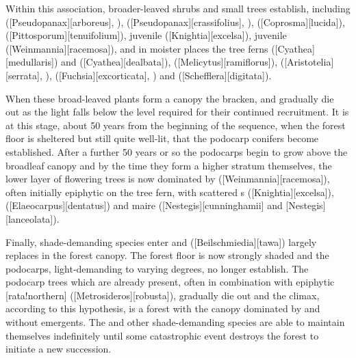 Within this association, broader-leaved shrubs and small trees establish, including  ([Pseudopanax][arboreus], ),  ([Pseudopanax][crassifolius], ),  ([Coprosma][lucida]),  ([Pittosporum][tenuifolium]), juvenile  ([Knightia][excelsa]), juvenile  ([Weinmannia][racemosa]), and in moister places the tree ferns  ([Cyathea][medullaris]) and  ([Cyathea][dealbata]),  ([Melicytus][ramiflorus]),  ([Aristotelia][serrata], ),  ([Fuchsia][excorticata], ) and  ([Schefflera][digitata]).

When these broad-leaved plants form a canopy the bracken,  and  gradually die out as the light falls below the level required for their continued recruitment.
It is at this stage, about 50 years from the beginning of the sequence, when the forest floor is sheltered but still quite well-lit, that the podocarp conifers become established.
After a further 50 years or so the podocarps begin to grow above the broadleaf canopy and by the time they form a higher stratum themselves, the lower layer of flowering trees is now dominated by  ([Weinmannia][racemosa]), often initially epiphytic on the  tree fern, with scattered s ([Knightia][excelsa]),  ([Elaeocarpus][dentatus]) and maire ([Nestegis][cunninghamii] and [Nestegis][lanceolata]).

Finally, shade-demanding species enter and  ([Beilschmiedia][tawa]) largely replaces  in the forest canopy.
The forest floor is now strongly shaded and the podocarps, light-demanding to varying degrees, no longer establish.
The podocarp trees which are already present, often in combination with epiphytic [rata!northern] ([Metrosideros][robusta]), gradually die out and the climax, according to this hypothesis, is a forest with the canopy dominated by  and without emergents.
The  and other shade-demanding species are able to maintain themselves indefinitely until some catastrophic event destroys the forest to initiate a new succession.

